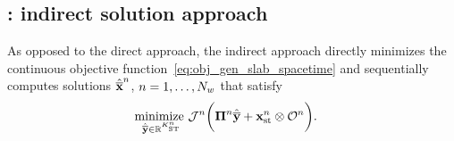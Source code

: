 \subsection{\spaceTimeAcronym: indirect solution approach}
As opposed to the direct approach, the indirect approach directly minimizes the continuous objective function~\eqref{eq:obj_gen_slab_spacetime} and sequentially computes solutions $\hat{\mathbf{\overline{x}}}^{n}$, $n = 1,\ldots,N_w$ that satisfy
\begin{equation}\label{eq:obj_gen_slab2}
\begin{split}
 & \underset{\stgenstatey \in \RR{\stdimArg{n}}}{\text{minimize }} \mathcal{J}^n \bigg( \stbasisArgnt{n} \stgenstatey + \stateInterceptSTArg{n} \otimes \onesFunctionArg{n} \bigg) .%
\end{split} 
\end{equation}
